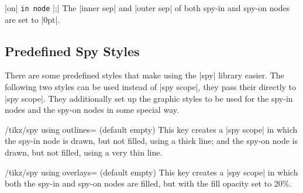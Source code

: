 \begin{command}{\spy {} |on|  \texttt{in node} |;|}
    The |inner sep| and |outer sep| of both spy-in and spy-on nodes are set to
    |0pt|.
\end{command}


\subsection{Predefined Spy Styles}

There are some predefined styles that make using the |spy| library easier. The
following two styles can be used instead of |spy scope|, they pass their
 directly to |spy scope|. They additionally set up the graphic
styles to be used for the spy-in nodes and the spy-on nodes in some special
way.

\begin{key}{/tikz/spy using outlines= (default \normalfont empty)}
    This key creates a |spy scope| in which the spy-in node is drawn, but not
    filled, using a thick line; and the spy-on node is drawn, but not filled,
    using a very thin line.
\begin{codeexample}[preamble={\usetikzlibrary{decorations.fractals,spy}}]
\end{codeexample}
\end{key}

\begin{key}{/tikz/spy using overlays= (default \normalfont empty)}
    This key creates a |spy scope| in which both the spy-in and spy-on nodes
    are filled, but with the fill opacity set to 20\%.
\begin{codeexample}[preamble={\usetikzlibrary{decorations.fractals,spy}}]
\end{codeexample}
\end{key}

